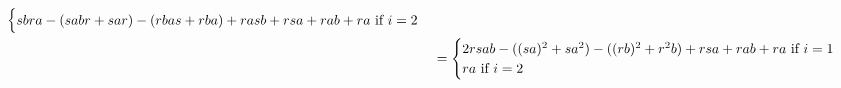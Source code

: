 \begin{example}
\begin{enumerate}
$$\begin{aligned}
\begin{cases}
                                \text{$
                                    sbra
                                    - (sabr + sar)
                                    - (rbas + rba)
                                    + rasb + rsa + rab + ra
                                $ if $i = 2$}
                            \end{cases}
                            \\
                            & = 
                            \begin{cases}
                                \text{$2 rsab - ( (sa)^2 + s a^2 ) - ( (rb)^2 + r^2 b ) + rsa + rab + ra$ if $i = 1$}
                                \\
                                \text{$ra$ if $i = 2$}
                            \end{cases}
                        \end{aligned}
                    $$
                

\end{enumerate}
\end{example}

